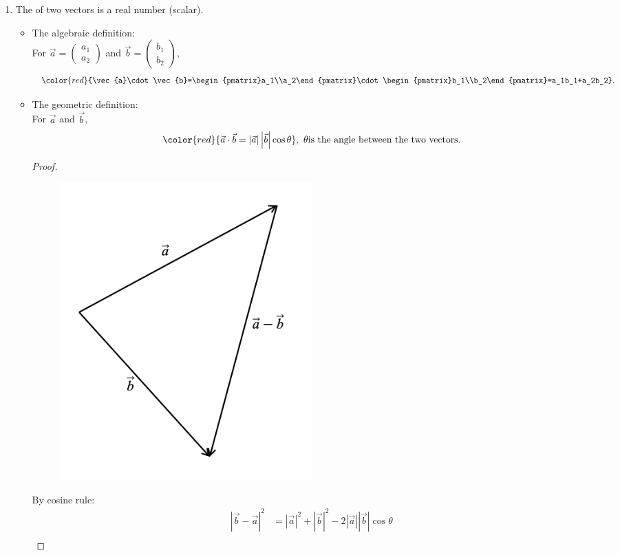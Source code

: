 \documentclass[12pt, a4paper]{article}
\newtheorem{proof}{Proof}[subsection]
\begin{document}
\begin{enumerate}
  \item The \textbf{\color{red}{scalar product}} of two vectors is a real number (scalar). 
  \begin{itemize}
    \item The algebraic definition: \\
    For $\vec{a}=\begin{pmatrix}a_1\\a_2\end{pmatrix}$ and $\vec{b}=\begin{pmatrix}b_1\\b_2\end{pmatrix}$,
    $${\color{red}{\vec{a}\cdot\vec{b}=\begin{pmatrix}a_1\\a_2\end{pmatrix}\cdot\begin{pmatrix}b_1\\b_2\end{pmatrix}=a_1b_1+a_2b_2}}.$$
    {\color{green}{The scalar product is also called the dot product. }}
    \item The geometric definition: \\
    For $\vec{a}$ and $\vec{b}$,
    $${\color{red}{\vec{a}\cdot\vec{b}=\left|\vec{a}\right|\left|\vec{b}\right|\cos\theta}},\ \theta{\text{is the angle between the two vectors.}}$$
    \begin{proof}
      \begin{figure}[H]
        \centering
        \includegraphics[width=0.5\textwidth]{Fig.3.7.jpg}
      \end{figure}
      By cosine rule: 
      $$\begin{aligned}
        \left|\vec{b}-\vec{a}\right|^2&=\left|\vec{a}\right|^2+\left|\vec{b}\right|^2-2\left|\vec{a}\right|\left|\vec{b}\right|\cos\theta\\

\end{aligned}$$
\end{proof}
\end{itemize}
\end{enumerate}
\end{document}

